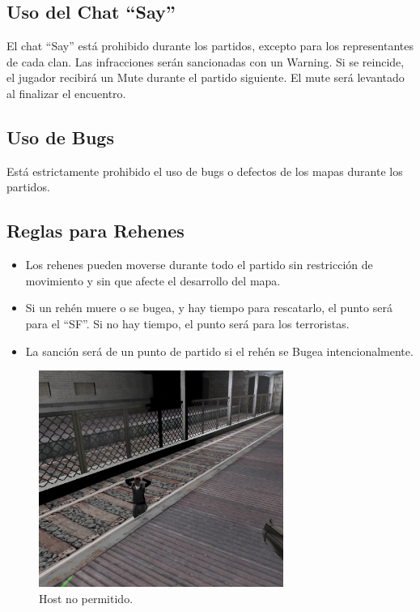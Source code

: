 \documentclass[a4paper, 11pt]{article}
\begin{document}
    \subsection{Uso del Chat “Say”}
    El chat “Say” está prohibido durante los partidos, excepto para los representantes de cada clan. Las infracciones serán sancionadas con un Warning. Si se reincide, el jugador recibirá un Mute durante el partido siguiente. El mute será levantado al finalizar el encuentro.

    \subsection{Uso de Bugs}
    Está estrictamente prohibido el uso de bugs o defectos de los mapas durante los partidos.

    \subsection{Reglas para Rehenes}

    \begin{itemize}
        \item Los rehenes pueden moverse durante todo el partido sin restricción de movimiento y sin que afecte el desarrollo del mapa.
        \item Si un rehén muere o se bugea, y hay tiempo para rescatarlo, el punto será para el “SF”. Si no hay tiempo, el punto será para los terroristas.
        \item La sanción será de un punto de partido si el rehén se Bugea intencionalmente.
    \end{itemize}

    
    \begin{figure}[htb]
        \centering
        \includegraphics[width=8cm]{img/host_bug.png}
        \caption{Host no permitido.}
    \end{figure} 
\end{document}
